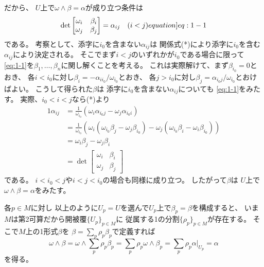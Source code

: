 \documentclass[report, notitlepage]{jlreq}
\begin{document}
\begin{answer}
    だから、
    $U$上で$\omega \wedge \beta = \alpha$が成り立つ条件は
    \begin{equation}
        \det \begin{bmatrix}
            \omega_i & \beta_i \\
            \omega_j & \beta_j
        \end{bmatrix}
        = \alpha_{ij}
        \quad
        (i < j)
        \label[equation]{eq:1-1}
    \end{equation}
    である。
    考察として、添字に$i_0$を含まない$\alpha_{ij}$は
    関係式(*)により添字に$i_0$を含む$\alpha_{ij}$により決定される。
    そこでまず$i < j$のいずれかが$i_0$である場合に限って
    \cref{eq:1-1}を$\beta_1, \dots, \beta_n$に関し解くことを考える。
    これは実際解けて、まず$\beta_{i_0} = 0$とおき、
    各$i < i_0$に対し$\beta_i = - \alpha_{i i_0} / \omega_{i_0}$とおき、
    各$j > i_0$に対し$\beta_j = \alpha_{i_0 j} / \omega_{i_0}$とおけばよい。
    こうして得られた$\beta$は
    添字に$i_0$を含まない$\alpha_{ij}$についても
    \cref{eq:1-1}をみたす。
    実際、$i_0 < i < j$なら(*)より
    \begin{alignat}{1}
        \alpha_{ij}
            &= \frac{1}{\omega_{i_0}}
                (\omega_i \alpha_{i_0 j} - \omega_j \alpha_{i_0 i}) \\
            &= \frac{1}{\omega_{i_0}}
                \left(
                    \omega_i (\omega_{i_0} \beta_j - \omega_j \beta_{i_0})
                    - \omega_j (\omega_{i_0} \beta_i - \omega_i \beta_{i_0})
                \right) \\
            &= \omega_i \beta_j - \omega_j \beta_i \\
            &= \det \begin{bmatrix}
                \omega_i & \beta_i \\
                \omega_j & \beta_j
            \end{bmatrix}
    \end{alignat}
    である。
    $i < i_0 < j$や$i < j < i_0$の場合も同様に成り立つ。
    したがって$\beta$は
    $U$上で$\omega \wedge \beta = \alpha$をみたす。

    各$p \in M$に対し
    以上のように$U_p = U$を選んで$U_p$上で$\beta_p = \beta$を構成すると、
    いま$M$は第2可算だから開被覆$\{ U_p \}_{p \in M}$に
    従属する1の分割$\{ \rho_p \}_{p \in M}$が存在する。
    そこで$M$上の1形式$\beta$を
    $\beta = \sum_p \rho_p \beta_p$で定義すれば
    \begin{equation}
        \omega \wedge \beta
            = \omega \wedge \sum_p \rho_p \beta_p
            = \sum_p \rho_p \omega \wedge \beta_p
            = \sum_p \rho_p \alpha|_{U_p}
            = \alpha
    \end{equation}
    を得る。
\end{answer}
\end{document}
